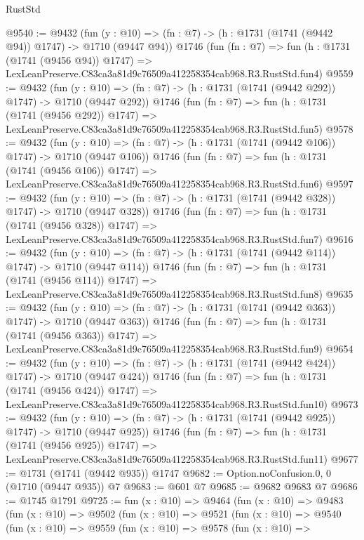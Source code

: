 \begin{lexlean}{RustStd}
\begin{coremodule}
@9540 := @9432
    (fun (y : @10) => (fn : @7) -> (h : @1731 (@1741 (@9442 @94)) @1747) -> @1710 (@9447 @94))
    @1746
    (fun (fn : @7) =>
    fun (h : @1731 (@1741 (@9456 @94)) @1747) =>
    LexLeanPreserve.C83ca3a81d9c76509a412258354cab968.R3.RustStd.fun4)
@9559 := @9432
    (fun (y : @10) => (fn : @7) -> (h : @1731 (@1741 (@9442 @292)) @1747) -> @1710 (@9447 @292))
    @1746
    (fun (fn : @7) =>
    fun (h : @1731 (@1741 (@9456 @292)) @1747) =>
    LexLeanPreserve.C83ca3a81d9c76509a412258354cab968.R3.RustStd.fun5)
@9578 := @9432
    (fun (y : @10) => (fn : @7) -> (h : @1731 (@1741 (@9442 @106)) @1747) -> @1710 (@9447 @106))
    @1746
    (fun (fn : @7) =>
    fun (h : @1731 (@1741 (@9456 @106)) @1747) =>
    LexLeanPreserve.C83ca3a81d9c76509a412258354cab968.R3.RustStd.fun6)
@9597 := @9432
    (fun (y : @10) => (fn : @7) -> (h : @1731 (@1741 (@9442 @328)) @1747) -> @1710 (@9447 @328))
    @1746
    (fun (fn : @7) =>
    fun (h : @1731 (@1741 (@9456 @328)) @1747) =>
    LexLeanPreserve.C83ca3a81d9c76509a412258354cab968.R3.RustStd.fun7)
@9616 := @9432
    (fun (y : @10) => (fn : @7) -> (h : @1731 (@1741 (@9442 @114)) @1747) -> @1710 (@9447 @114))
    @1746
    (fun (fn : @7) =>
    fun (h : @1731 (@1741 (@9456 @114)) @1747) =>
    LexLeanPreserve.C83ca3a81d9c76509a412258354cab968.R3.RustStd.fun8)
@9635 := @9432
    (fun (y : @10) => (fn : @7) -> (h : @1731 (@1741 (@9442 @363)) @1747) -> @1710 (@9447 @363))
    @1746
    (fun (fn : @7) =>
    fun (h : @1731 (@1741 (@9456 @363)) @1747) =>
    LexLeanPreserve.C83ca3a81d9c76509a412258354cab968.R3.RustStd.fun9)
@9654 := @9432
    (fun (y : @10) => (fn : @7) -> (h : @1731 (@1741 (@9442 @424)) @1747) -> @1710 (@9447 @424))
    @1746
    (fun (fn : @7) =>
    fun (h : @1731 (@1741 (@9456 @424)) @1747) =>
    LexLeanPreserve.C83ca3a81d9c76509a412258354cab968.R3.RustStd.fun10)
@9673 := @9432
    (fun (y : @10) => (fn : @7) -> (h : @1731 (@1741 (@9442 @925)) @1747) -> @1710 (@9447 @925))
    @1746
    (fun (fn : @7) =>
    fun (h : @1731 (@1741 (@9456 @925)) @1747) =>
    LexLeanPreserve.C83ca3a81d9c76509a412258354cab968.R3.RustStd.fun11)
@9677 := @1731 (@1741 (@9442 @935)) @1747
@9682 := Option.noConfusion.{0, 0} (@1710 (@9447 @935)) @7
@9683 := @601 @7
@9685 := @9682 @9683 @7
@9686 := @1745 @1791
@9725 := fun (x : @10) =>
  @9464
    (fun (x : @10) =>
    @9483
      (fun (x : @10) =>
      @9502
        (fun (x : @10) =>
        @9521
          (fun (x : @10) =>
          @9540
            (fun (x : @10) =>
            @9559
              (fun (x : @10) =>
              @9578
                (fun (x : @10) =>

\end{coremodule}
\end{lexlean}

